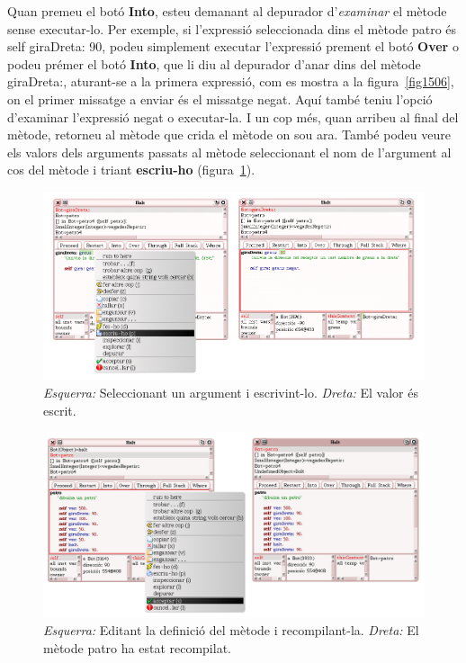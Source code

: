 Quan premeu el botó \textbf{Into}, esteu demanant al depurador d'\emph{examinar} el mètode sense executar-lo. Per exemple, si l'expressió seleccionada dins el mètode \textsf{patro} és \textsf{self giraDreta: 90}, podeu simplement executar l'expressió prement el botó \textbf{Over} o podeu prémer el botó \textbf{Into}, que li diu al depurador d'anar dins del mètode \textsf{giraDreta:}, aturant-se a la primera expressió, com es mostra a la figura~\ref{fig1506}, on el primer missatge a enviar és el missatge \textsf{negat}. Aquí també teniu l'opció d'examinar l'expressió \textsf{negat} o executar-la. I un cop més, quan arribeu al final del mètode, retorneu al mètode que crida el mètode on sou ara. També podeu veure els valors dels arguments passats al mètode seleccionant el nom de l'argument al cos del mètode i triant \textbf{escriu-ho} (figura~\ref{fig1508}).  

\newpage

\begin{figure}[h!]
\begin{center}
\includegraphics[scale=1.5]{Imatges/figura15-8.png}
\end{center}
\caption{\emph{Esquerra:} Seleccionant un argument i escrivint-lo.
\emph{Dreta:} El valor és escrit.}
\label{fig1508}
\end{figure}

\begin{figure}[h!]
\begin{center}
\includegraphics[scale=0.35]{Imatges/figura15-9.png}
\end{center}
\caption{\emph{Esquerra:} Editant la definició del mètode i recompilant-la.
\emph{Dreta:} El mètode \textsf{\upshape patro} ha estat recompilat.}
\label{fig1509}
\end{figure}

